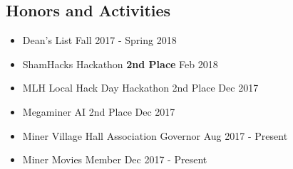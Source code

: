 \documentclass[9pt,oneside]{memoir}
\begin{document}
\vspace*{0pt}
\subsection*{Honors and Activities}

\begin{itemize}
	\item[] Dean's List
		\hfill Fall 2017 - Spring 2018
		\vspace*{-7pt}
	\item[] ShamHacks Hackathon \textemdash{} \textbf{2nd Place}
		\hfill Feb 2018
		\vspace*{-7pt}
	\item[] MLH Local Hack Day Hackathon \textemdash{} 2nd Place
		\hfill Dec 2017
		\vspace*{-7pt}
	\item[] Megaminer AI \textemdash{} 2nd Place
		\hfill Dec 2017
		\vspace*{-7pt}
	\item[] Miner Village Hall Association \textemdash{} Governor
		\hfill Aug 2017 - Present
		\vspace*{-7pt}
	\item[] Miner Movies \textemdash{} Member
		\hfill Dec 2017 - Present \hspace{1cm}
\end{itemize}
\end{document}
